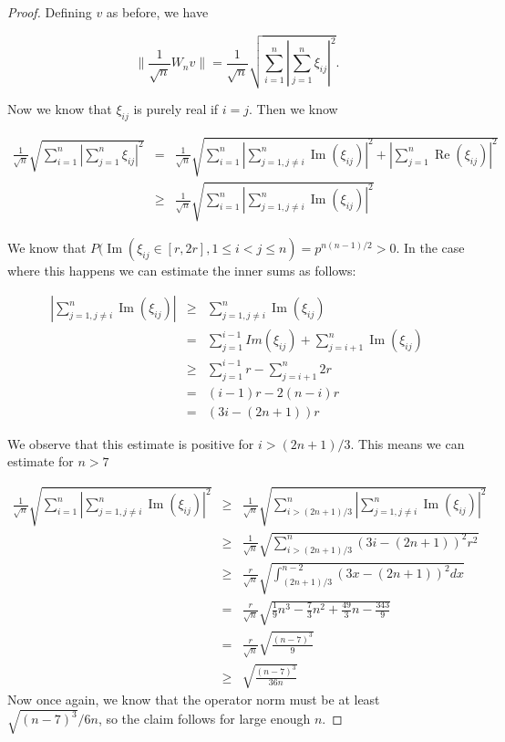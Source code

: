 \documentclass[12pt,a4paper,leqno]{report}
\renewcommand{\Re}{\operatorname{Re}}
\renewcommand{\Im}{\operatorname{Im}}
\theoremstyle{plain}
\theoremstyle{definition}
\theoremstyle{remark}
\begin{document}
\begin{proof}
Defining $v$ as before, we have 

\begin{equation*}
\|\frac{1}{\sqrt{n}}W_nv\| = \frac{1}{\sqrt{n}} \sqrt{\sum_{i=1}^n |\sum_{j=1}^n\xi_{ij}|^2}.
\end{equation*}

Now we know that $\xi_{ij}$ is purely real if $i=j$. Then we know

\begin{eqnarray*}
\frac{1}{\sqrt{n}} \sqrt{\sum_{i=1}^n |\sum_{j=1}^n\xi_{ij}|^2} & = & \frac{1}{\sqrt{n}} \sqrt{\sum_{i=1}^n |\sum_{j=1,j\neq i}^n \Im(\xi_{ij})|^2 + |\sum_{j=1}^{n} \Re(\xi_{ij})|^2}\\
& \geq & \frac{1}{\sqrt{n}} \sqrt{\sum_{i=1}^n |\sum_{j=1,j\neq i}^n\Im(\xi_{ij})|^2}
\end{eqnarray*}

We know that $P(\Im(\xi_{ij} \in [r,2r], 1 \leq i<j\leq n) = p^{n(n-1)/2} > 0$. In the case where this happens we can estimate the inner sums as follows:

\begin{eqnarray*}
|\sum_{j=1,j\neq i}^n \Im(\xi_{ij})| & \geq &
\sum_{j=1,j\neq i}^n \Im(\xi_{ij})\\
& = & \sum_{j=1}^{i-1}Im(\xi_{ij}) + \sum_{j=i+1}^n \Im(\xi_{ij})\\
& \geq & \sum_{j=1}^{i-1} r - \sum_{j=i+1}^n 2r\\
& = & (i-1)r - 2(n-i)r\\
& = & (3i - (2n+1))r
\end{eqnarray*}

We observe that this estimate is positive for $i> (2n+1)/3$. This means we can estimate for $n>7$

\begin{eqnarray*}
\frac{1}{\sqrt{n}} \sqrt{\sum_{i=1}^n |\sum_{j=1,j\neq i}^n \Im(\xi_{ij})|^2} & \geq & \frac{1}{\sqrt{n}} \sqrt{\sum_{i>(2n+1)/3}^n |\sum_{j=1,j\neq i}^n \Im(\xi_{ij})|^2}\\
& \geq & \frac{1}{\sqrt{n}} \sqrt{\sum_{i>(2n+1)/3}^n (3i - (2n+1))^2r^2}\\
& \geq & \frac{r}{\sqrt{n}} \sqrt{\int_{(2n+1)/3}^{n-2} (3x - (2n+1))^2dx}\\
& = & \frac{r}{\sqrt{n}} \sqrt{\frac{1}{9}n^3 - \frac{7}{3}n^2+\frac{49}{3}n-\frac{343}{9}}\\
& = & \frac{r}{\sqrt{n}} \sqrt{\frac{(n-7)^3}{9}}\\
& \geq & \sqrt{\frac{(n-7)^3}{36n}}
\end{eqnarray*}
Now once again, we know that the operator norm must be at least $\sqrt{(n-7)^3}/6n$, so the claim follows for large enough $n$.
\end{proof}
\end{document}
